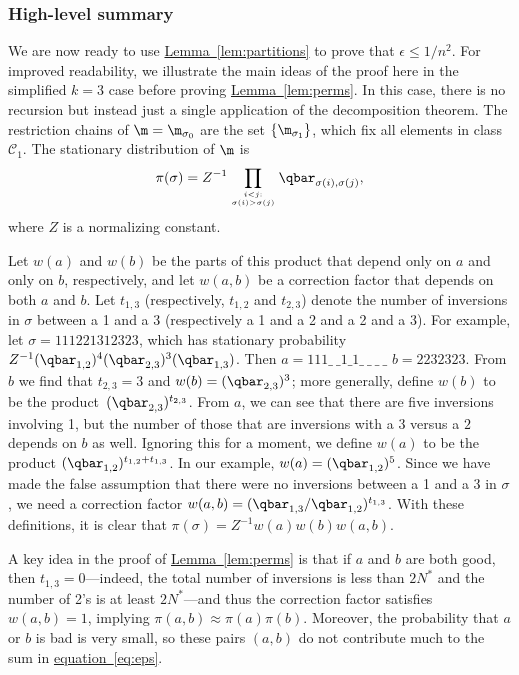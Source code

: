 \documentclass[11pt]{article}
\providecommand{\expref}[2]{\texorpdfstring{\hyperref[#2]{#1~\ref{#2}}}{#1~\ref{#2}}}
\providecommand{\expeqref}[2]{\texorpdfstring{\hyperref[#2]{#1~\eqref{#2}}}{#1~\eqref{#2}}}
\begin{document}
%
\subsubsection{High-level summary}  %
 We are now ready to use \expref{Lemma}{lem:partitions} to prove 
that  %
$\epsilon\leq 1/n^2$. %
For improved 
readability, we illustrate the main ideas of the proof here 
in the simplified $k=3$ case before proving \expref{Lemma}{lem:perms}. 
In this case, there is no recursion but 
instead just a single application of the decomposition theorem.  The 
restriction chains of $\m=\m_{\sigma_0}$ are the set 
$\{\m_{\sigma_1}\}$, which 
fix all elements in class $\mathcal{C}_1$.  
The stationary distribution of $\m$ is
\begin{equation}\label{eq:statdist}
\pi(\sigma) = Z^{-1} \prod_{i < j:\atop \sigma(i) > \sigma(j)}\qbar_{\sigma(i), \sigma(j)},
\end{equation}
where $Z$ is a normalizing constant.

Let $w(a)$ and $ w(b)$ be the parts of this product that depend only on 
$a$ and only on $b$, respectively, and let $w(a,b)$ be a correction 
factor that depends on both $a$ and $b$.  Let $t_{1,3}$ (respectively, 
$t_{1,2}$ and $t_{2,3}$) denote the number of inversions in $\sigma$ 
between a 1 and a 3 (respectively a 1 and a 2 and a 2 and a 3). For 
example, let $\sigma = 111221312323$, which has stationary probability 
$Z^{-1}(\qbar_{1,2})^4(\qbar_{2,3})^3(\qbar_{1,3})$.  Then $a=111\_\ \_1\_1\_\ \_\ \_\ \_$ 
$b=2232323$.  From $b$ we find that $t_{2,3}=3$ and 
$w(b)=(\qbar_{2,3})^3$; more generally, define $w(b)$ to be the 
product~$(\qbar_{2,3})^{t_{2,3}}$. From $a$, we can see that there are five 
inversions involving 1, but the number of those that are inversions 
with a $3$ versus a $2$ depends on $b$ as well. Ignoring this for a 
moment, we define $w(a)$ to be the product $(\qbar_{1,2})^{t_{1,2}+t_{1,3}}$. 
In our example, $w(a)=(\qbar_{1,2})^5$.  Since we have made the false 
assumption that there were no inversions between a 1 and a 3 in 
$\sigma$, we need a correction factor 
$w(a,b)=(\qbar_{1,3}/\qbar_{1,2})^{t_{1,3}}$.
With these definitions, it is clear that $\pi(\sigma)=Z^{-1}w(a)w(b)w(a,b)$.


A key idea in the proof of \expref{Lemma}{lem:perms} is that if $a$ and $b$ are both good, then 
$t_{1,3}=0$---indeed, the total number of inversions is less than 
$2N^*$ and the number of 2's is at least $2N^*$---and thus the 
correction factor satisfies $w(a,b)=1$, implying $\pi(a,b)\approx \pi(a)\pi(b)$. 
Moreover, the probability that $a$ or $b$ is bad is very small, so 
these pairs $(a,b)$ do not contribute much to the sum in 
\expeqref{equation}{eq:eps}.  
\end{document}
